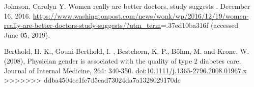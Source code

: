 \documentclass[11pt,]{article}
\begin{document}
Johnson, Carolyn Y. Women really are better doctors, study suggests .
December 16, 2016.
\url{https://www.washingtonpost.com/news/wonk/wp/2016/12/19/women-really-are-better-doctors-study-suggests/?utm_term}=.37ed10ba316f
(accessed June 05, 2019).

Berthold, H. K., Gouni‐Berthold, I. , Bestehorn, K. P., Böhm, M. and
Krone, W. (2008), Physician gender is associated with the quality of
type 2 diabetes care. Journal of Internal Medicine, 264: 340-350.
\url{doi:10.1111/j.1365-2796.2008.01967.x}
\textgreater{}\textgreater{}\textgreater{}\textgreater{}\textgreater{}\textgreater{}\textgreater{}
ddba4504cc1fe7d5ead73024da7a1328029170dc




\end{document}
